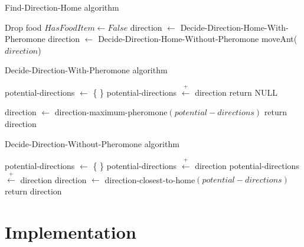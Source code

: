 \documentclass[a4paper, oneside, 11pt]{report}
\begin{document}
\begin{algorithm}[th]
	\caption{ Find-Direction-Home algorithm}  \label{Algorithm:Find_Home}
	\begin{algorithmic}[1]
			\State Drop food 
			\State $HasFoodItem \gets False$
		\Else
			\State direction $\leftarrow$ Decide-Direction-Home-With-Pheromone
				\State direction $\leftarrow$ Decide-Direction-Home-Without-Pheromone
			\EndIf
		\EndIf
		\State moveAnt($direction$)
	\end{algorithmic}
\end{algorithm}

\begin{algorithm}[th]
	\caption{ Decide-Direction-With-Pheromone algorithm}  \label{Algorithm:Home_Pheromone}
	\begin{algorithmic}[1]
		\State potential-directions $\leftarrow$ \{ \}
						\State potential-directions $\overset{+}{\leftarrow}$ direction
					\EndIf
				\EndIf
			\EndIf
		\EndWhile
			\State return NULL
		
		\Else
			\State direction $\leftarrow$ direction-maximum-pheromone$(potential-directions)$
			\State return direction
		\EndIf
	\end{algorithmic}
\end{algorithm}

\begin{algorithm}[th]
	\caption{ Decide-Direction-Without-Pheromone algorithm}
	 \label{Algorithm:Home_Distance}
	\begin{algorithmic}[1]
		\State potential-directions $\leftarrow$ \{ \}
				\State potential-directions $\overset{+}{\leftarrow}$ direction
				\State potential-directions $\overset{+}{\leftarrow}$ direction
			\EndIf
		\EndIf
		\EndWhile
		\State direction $\leftarrow$ direction-closest-to-home$(potential-directions)$
		\State return direction
	\end{algorithmic}
\end{algorithm}

\chapter{Implementation}
\label{chap:Implementation}
\end{document}
